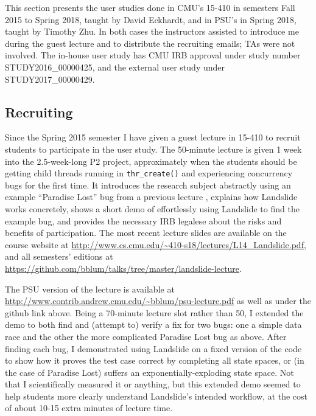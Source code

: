 This section presents the user studies done in
CMU's 15-410 in semesters Fall 2015 to Spring 2018,
taught by David Eckhardt,
and in PSU's \psuos in Spring 2018,
taught by Timothy Zhu.
In both cases the instructors assisted to introduce me during the guest lecture
and to distribute the recruiting emails;
TAs were not involved.
The in-house user study has CMU IRB approval under study number STUDY2016\_00000425,
and the external user study under STUDY2017\_00000429.


\subsection{Recruiting}
\label{sec:education-pebbles-recruiting}

Since the Spring 2015 semester I have given a guest lecture in 15-410
to recruit students to participate in the user study.
The 50-minute lecture is given 1 week into the 2.5-week-long P2 project,
approximately when the students should be getting child threads running in {\tt thr\_create()}
and experiencing concurrency bugs for the first time.
It introduces the research subject abstractly
using an example ``Paradise Lost'' bug from a previous lecture \cite{paradise-lost},
explains how Landslide works concretely,
shows a short demo of effortlessly using Landslide to find the example bug,
and provides the necessary IRB legalese about the risks and benefits of participation.
The most recent lecture slides are available on the course website at
\url{http://www.cs.cmu.edu/~410-s18/lectures/L14_Landslide.pdf},
and all semesters' editions at
\url{https://github.com/bblum/talks/tree/master/landslide-lecture}.

The PSU version of the lecture
is available at
\url{http://www.contrib.andrew.cmu.edu/~bblum/psu-lecture.pdf}
as well as under the github link above.
Being a 70-minute lecture slot rather than 50, I extended the demo to
both find and (attempt to) verify a fix for two bugs:
one a simple data race and the other the more complicated Paradise Lost bug as above.
After finding each bug, I demonstrated using Landslide on a fixed version of the code
to show how it proves the test case correct by completing all state spaces,
or (in the case of Paradise Lost) suffers an exponentially-exploding state space.
Not that I scientifically measured it or anything,
but this extended demo seemed to help students more clearly understand Landslide's intended workflow,
at the cost of about 10-15 extra minutes of lecture time.

